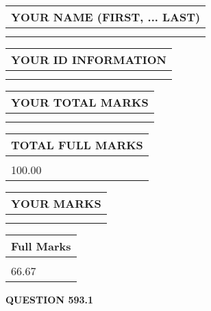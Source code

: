 \documentclass{ctexart}
\begin{document}
   
   
   
\newpage 
\setcounter{page}{ 
   593001 } 
   
   
   
   
\noindent\begin{tabular}{|l|}
\hline
YOUR NAME (FIRST, ... LAST)  \\
\hline
 \\ 
 \\ 
\hline
\end{tabular}
\hspace{0.05in} \begin{tabular}{|l|}
\hline
 YOUR   ID   INFORMATION  \\
\hline
 \\ 
 \\ 
\hline
\end{tabular}
   
   
\vspace{0.2in}\noindent\begin{tabular}{|l|}
\hline
YOUR TOTAL MARKS  \\
\hline
 \\ 
 \\ 
\hline
\end{tabular}
\hspace{0.05in} \begin{tabular}{|l|}
\hline
TOTAL FULL MARKS  \\
\hline
 \\ 
100.00 \\
\hline
\end{tabular}
   
   
 \vspace{0.2in}
 
 
 
 
   
   
  
\vspace{0.2in}
  
\noindent\begin{tabular}{|l|}
\hline
 YOUR MARKS  \\
\hline
 \\ 
 \\ 
\hline
\end{tabular}
\hspace{0.05in} \begin{tabular}{|l|}
\hline
 Full Marks  \\
\hline
 \\ 
66.67 \\
\hline
\end{tabular}
{\textbf{\Large{QUESTION
593.1 
}}}
  
\end{document}

